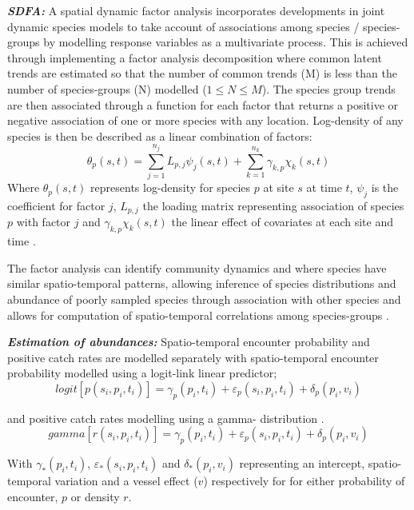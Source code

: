 \documentclass{nature}
\begin{document}
\begin{linenumbers}
\textbf{\textit{SDFA:}} A spatial dynamic factor analysis incorporates
developments in joint dynamic species models \cite{Thorson2017} to take account
of associations among species / species-groups by modelling response variables
as a multivariate process. This is achieved through implementing a factor
analysis decomposition where common latent trends are estimated so that the
number of common trends (M) is less than the number of species-groups (N)
modelled ($1 \leq N \leq M$). The species group trends are then associated
through a function for each factor that returns a positive or negative
association of one or more species with any location. Log-density of any
species is then be described as a linear combination of factors:
	\begin{equation}
		\theta_{p}(s,t) = \sum_{j=1}^{n_{j}}
		L_{p,j}\psi_{j}(s,t) +\sum_{k=1}^{n_{k}}
		\gamma_{k,p}\chi_{k}(s,t)
	\end{equation}
Where $\theta_{p}(s,t)$ represents log-density for species $p$ at site $s$ at
time $t$, $\psi_{j}$ is the coefficient for factor $j$, $L_{p,j}$ the loading
matrix representing association of species $p$ with factor $j$ and
$\gamma_{k,p}\chi_{k}(s,t)$ the linear effect of covariates at each site and
time \cite{Thorson2016b}. 

The factor analysis can identify community dynamics and where species have
similar spatio-temporal patterns, allowing inference of species distributions
and abundance of poorly sampled species through association with other species
and allows for computation of spatio-temporal correlations among species-groups
\cite{Thorson2016b}.

\textbf{\textit{Estimation of abundances:}} Spatio-temporal encounter
probability and positive catch rates are modelled separately with
spatio-temporal encounter probability modelled using a logit-link linear
predictor;
		\begin{equation}
			logit[p(s_{i},p_{i},t_{i})] = \gamma_{p}(p_{i},t_{i}) +
			\varepsilon_{p}(s_{i},p_{i},t_{i}) + \delta_{p}(p_{i},
			v_{i})
		\end{equation}

and positive catch rates modelling using a gamma- distribution \cite{Thorson2015a}.  
		\begin{equation}
			gamma[r(s_{i},p_{i},t_{i})] = \gamma_{p}(p_{i},t_{i}) +
			\varepsilon_{p}(s_{i},p_{i},t_{i}) + \delta_{p}(p_{i},
			v_{i})
		\end{equation}

With $\gamma_{*}(p_{i},t_{i})$, $\varepsilon_{*}(s_{i},p_{i},t_{i})$ and
$\delta_{*}(p_{i}, v_{i})$ representing an intercept, spatio-temporal variation
and a vessel effect ($v$) respectively for for either probability of encounter,
$p$ or density $r$.


\end{linenumbers}
\end{document}
